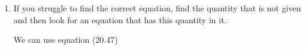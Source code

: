 {\begin{mdframed}[linewidth=4, leftmargin=40, rightmargin=40]
\begin{exercise}
\begin{enumerate}[noitemsep, label=\textbf{Step} \textbf{\arabic*}. ]
          
          \item  
          \label{m38796*id77785}If you struggle to find the correct equation, find the quantity that is not given and then look for an equation that has this quantity in it.\par 
          \label{m38796*id77790}We can use equation (20.47)\par 
          \label{m38796*id77796}\nopagebreak\noindent{}
    

\end{enumerate}
\end{exercise}
\end{mdframed}}
